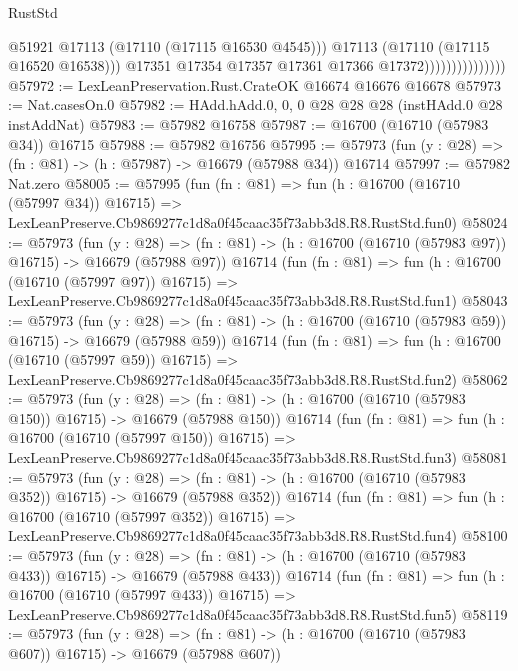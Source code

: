 \begin{lexlean}{RustStd}
\begin{coremodule}
                                      @51921
                                      @17113
                                      (@17110 (@17115 @16530 @4545)))
                                    @17113
                                    (@17110 (@17115 @16520 @16538)))
                                  @17351
                                  @17354
                                  @17357
                                  @17361
                                  @17366
                                  @17372)))))))))))))))
@57972 := LexLeanPreservation.Rust.CrateOK @16674 @16676 @16678
@57973 := Nat.casesOn.{0}
@57982 := HAdd.hAdd.{0, 0, 0} @28 @28 @28 (instHAdd.{0} @28 instAddNat)
@57983 := @57982 @16758
@57987 := @16700 (@16710 (@57983 @34)) @16715
@57988 := @57982 @16756
@57995 := @57973 (fun (y : @28) => (fn : @81) -> (h : @57987) -> @16679 (@57988 @34)) @16714
@57997 := @57982 Nat.zero
@58005 := @57995
    (fun (fn : @81) =>
    fun (h : @16700 (@16710 (@57997 @34)) @16715) =>
    LexLeanPreserve.Cb9869277c1d8a0f45caac35f73abb3d8.R8.RustStd.fun0)
@58024 := @57973
    (fun (y : @28) =>
    (fn : @81) -> (h : @16700 (@16710 (@57983 @97)) @16715) -> @16679 (@57988 @97))
    @16714
    (fun (fn : @81) =>
    fun (h : @16700 (@16710 (@57997 @97)) @16715) =>
    LexLeanPreserve.Cb9869277c1d8a0f45caac35f73abb3d8.R8.RustStd.fun1)
@58043 := @57973
    (fun (y : @28) =>
    (fn : @81) -> (h : @16700 (@16710 (@57983 @59)) @16715) -> @16679 (@57988 @59))
    @16714
    (fun (fn : @81) =>
    fun (h : @16700 (@16710 (@57997 @59)) @16715) =>
    LexLeanPreserve.Cb9869277c1d8a0f45caac35f73abb3d8.R8.RustStd.fun2)
@58062 := @57973
    (fun (y : @28) =>
    (fn : @81) -> (h : @16700 (@16710 (@57983 @150)) @16715) -> @16679 (@57988 @150))
    @16714
    (fun (fn : @81) =>
    fun (h : @16700 (@16710 (@57997 @150)) @16715) =>
    LexLeanPreserve.Cb9869277c1d8a0f45caac35f73abb3d8.R8.RustStd.fun3)
@58081 := @57973
    (fun (y : @28) =>
    (fn : @81) -> (h : @16700 (@16710 (@57983 @352)) @16715) -> @16679 (@57988 @352))
    @16714
    (fun (fn : @81) =>
    fun (h : @16700 (@16710 (@57997 @352)) @16715) =>
    LexLeanPreserve.Cb9869277c1d8a0f45caac35f73abb3d8.R8.RustStd.fun4)
@58100 := @57973
    (fun (y : @28) =>
    (fn : @81) -> (h : @16700 (@16710 (@57983 @433)) @16715) -> @16679 (@57988 @433))
    @16714
    (fun (fn : @81) =>
    fun (h : @16700 (@16710 (@57997 @433)) @16715) =>
    LexLeanPreserve.Cb9869277c1d8a0f45caac35f73abb3d8.R8.RustStd.fun5)
@58119 := @57973
    (fun (y : @28) =>
    (fn : @81) -> (h : @16700 (@16710 (@57983 @607)) @16715) -> @16679 (@57988 @607))

\end{coremodule}
\end{lexlean}
